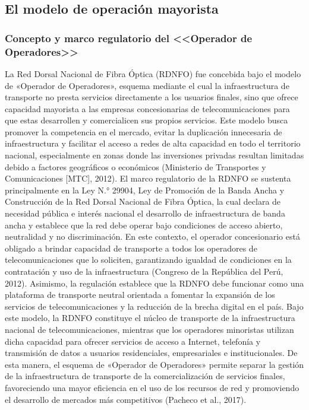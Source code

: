 \subsection{El modelo de operación mayorista}
\subsubsection{Concepto y marco regulatorio del <<Operador de Operadores>>}
La Red Dorsal Nacional de Fibra Óptica (RDNFO) fue concebida bajo el modelo de «Operador de Operadores», esquema mediante el cual la infraestructura de transporte no presta servicios directamente a los usuarios finales, sino que ofrece capacidad mayorista a las empresas concesionarias de telecomunicaciones para que estas desarrollen y comercialicen sus propios servicios. Este modelo busca promover la competencia en el mercado, evitar la duplicación innecesaria de infraestructura y facilitar el acceso a redes de alta capacidad en todo el territorio nacional, especialmente en zonas donde las inversiones privadas resultan limitadas debido a factores geográficos o económicos (Ministerio de Transportes y Comunicaciones [MTC], 2012). 
El marco regulatorio de la RDNFO se sustenta principalmente en la Ley N.° 29904, Ley de Promoción de la Banda Ancha y Construcción de la Red Dorsal Nacional de Fibra Óptica, la cual declara de necesidad pública e interés nacional el desarrollo de infraestructura de banda ancha y establece que la red debe operar bajo condiciones de acceso abierto, neutralidad y no discriminación. En este contexto, el operador concesionario está obligado a brindar capacidad de transporte a todos los operadores de telecomunicaciones que lo soliciten, garantizando igualdad de condiciones en la contratación y uso de la infraestructura (Congreso de la República del Perú, 2012). Asimismo, la regulación establece que la RDNFO debe funcionar como una plataforma de transporte neutral orientada a fomentar la expansión de los servicios de telecomunicaciones y la reducción de la brecha digital en el país. 
Bajo este modelo, la RDNFO constituye el núcleo de transporte de la infraestructura nacional de telecomunicaciones, mientras que los operadores minoristas utilizan dicha capacidad para ofrecer servicios de acceso a Internet, telefonía y transmisión de datos a usuarios residenciales, empresariales e institucionales. De esta manera, el esquema de «Operador de Operadores» permite separar la gestión de la infraestructura de transporte de la comercialización de servicios finales, favoreciendo una mayor eficiencia en el uso de los recursos de red y promoviendo el desarrollo de mercados más competitivos (Pacheco et al., 2017). 
